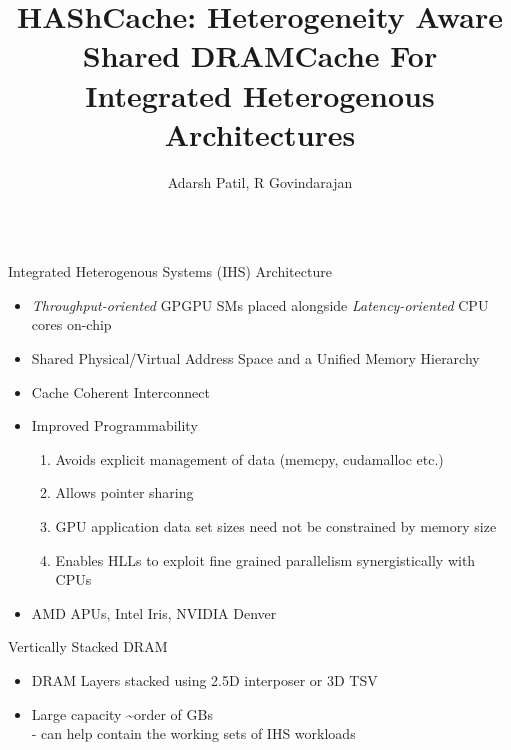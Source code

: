 \documentclass[final,t]{beamer}
\title{\LARGE HAShCache: Heterogeneity Aware Shared DRAMCache For Integrated Heterogenous Architectures}
\author{Adarsh Patil, R Govindarajan}
\institute{Department of CSA, Indian Institute of Science, Bangalore }
\begin{document}


\begin{frame}[t,fragile]{}
\begin{columns}[t]

\small

\begin{column}{.47\linewidth}

    \begin{exampleblock}{Integrated Heterogenous Systems (IHS) Architecture}
    \begin{itemize}
    	\item \textit{Throughput-oriented} GPGPU SMs placed alongside \textit{Latency-oriented} CPU cores on-chip
   		\item Shared Physical/Virtual Address Space and a Unified Memory Hierarchy 
		\item Cache Coherent Interconnect
    	\item Improved Programmability
    	\begin{enumerate}[i]
	    	\item Avoids explicit management of data (memcpy, cudamalloc etc.)
	    	\item Allows pointer sharing
	    	\item GPU application data set sizes need not be constrained by memory size
	    	\item Enables HLLs to exploit fine grained parallelism synergistically with CPUs
    	\end{enumerate}
		\item AMD APUs, Intel Iris, NVIDIA Denver
    \end{itemize}
    \end{exampleblock}
    \begin{exampleblock}{Vertically Stacked DRAM}
    \begin{itemize}
        	\item DRAM Layers stacked using 2.5D interposer or 3D TSV
       		\item Large capacity \textasciitilde order of GBs \\
       				\qquad - can help contain the working sets of IHS workloads

\end{itemize}
\end{exampleblock}
\end{column}
\end{columns}
\end{frame}
\end{document}
